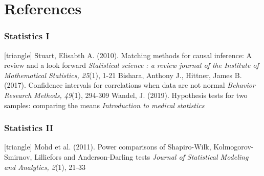 \documentclass[xcolor=table]{beamer}
\begin{document}

\appendix

\section{References}
\begin{frame}
	\frametitle{Statistics I}
	\footnotesize{
		\begin{thebibliography}{99}
			[triangle]
			 Stuart, Elisabth A. (2010).
			\newblock Matching methods for causal inference: A review and a look forward
			\newblock \textit{Statistical science : a review journal of the Institute of Mathematical Statistics, 25}(1), 1-21
			\vspace{1mm}
			 Bishara, Anthony J., Hittner, James B. (2017).
			\newblock Confidence intervals for correlations when data are not normal
			\newblock \textit{Behavior Research Methods, 49}(1), 294-309
			\vspace{1mm}
			 Wandel, J. (2019).
			\newblock Hypothesis tests for two samples: comparing the means
			\newblock \textit{Introduction to medical statistics}
		\end{thebibliography}
	}
\end{frame}


\begin{frame}
	\frametitle{Statistics II}
	\footnotesize{
		\begin{thebibliography}{99}
			[triangle]
			 Mohd et al. (2011).
			\newblock Power comparisons of Shapiro-Wilk, Kolmogorov-Smirnov, Lilliefors and Anderson-Darling tests
			\newblock \textit{Journal of Statistical Modeling and Analytics, 2}(1), 21-33
			\vspace{1mm}
		\end{thebibliography}
	}
\end{frame}

\end{document}
